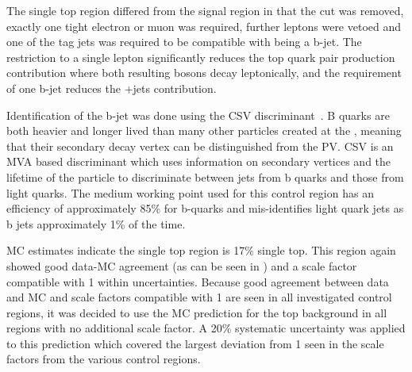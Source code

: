 The single top region differed from the signal region in that the \jetmetdphi cut was removed, exactly one tight electron or muon was required, further leptons were vetoed and one of the tag jets was required to be compatible with being a b-jet. The restriction to a single lepton significantly reduces the top quark pair production contribution where both resulting \PW bosons decay leptonically, and the requirement of one b-jet reduces the \PW+jets contribution. 

Identification of the b-jet was done using the \ac{CSV} discriminant~\cite{bjets}. B quarks are both heavier and longer lived than many other particles created at the \LHC, meaning that their secondary decay vertex can be distinguished from the \ac{PV}. \ac{CSV} is an \ac{MVA} based discriminant which uses information on secondary vertices and the lifetime of the particle to discriminate between jets from b quarks and those from light quarks. The medium working point used for this control region has an efficiency of approximately 85\% for b-quarks and mis-identifies light quark jets as b jets approximately 1\% of the time.

\ac{MC} estimates indicate the single top region is 17\% single top. This region again showed good data-\ac{MC} agreement (as can be seen in ) and a scale factor compatible with 1 within uncertainties. Because good agreement between data and \ac{MC} and scale factors compatible with 1 are seen in all investigated control regions, it was decided to use the \ac{MC} prediction for the top background in all regions with no additional scale factor. A 20\% systematic uncertainty was applied to this prediction which covered the largest deviation from 1 seen in the scale factors from the various control regions.

